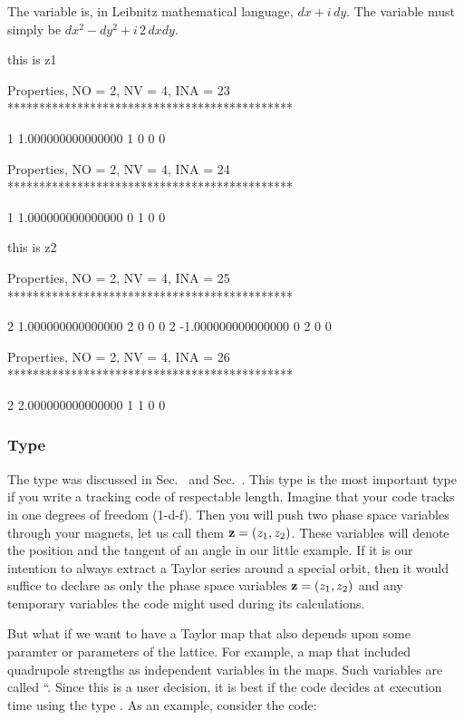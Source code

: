 \documentclass[english,12pt,article]{article} %
\begin{document}
The variable  is, in Leibnitz  mathematical  language, $dx+i \, dy$. The variable  must simply be $dx^2-dy^2+i\, 2\, dx dy$.
\begin{example1}
  this is z1

 Properties, NO =    2, NV =    4, INA =   23
 *********************************************

   1   1.000000000000000       1  0  0  0


 Properties, NO =    2, NV =    4, INA =   24
 *********************************************

   1   1.000000000000000       0  1  0  0

  this is z2

 Properties, NO =    2, NV =    4, INA =   25
 *********************************************

   2   1.000000000000000       2  0  0  0
   2  -1.000000000000000       0  2  0  0


 Properties, NO =    2, NV =    4, INA =   26
 *********************************************

   2   2.000000000000000       1  1  0  0
\end{example1}

\subsubsection{Type \protect{}}  \label{sec:real8code}

The  type was discussed in Sec.~ and Sec.~.
This type is the most important type if you write a tracking code of respectable length.  Imagine that your code tracks in one degrees of freedom (1-d-f). Then you will push two phase space variables through your magnets, let us call them ${\bf z}=(z_1,z_2)$. These variables will denote  the position and the tangent of an angle in our little example.  If it is our  intention to always extract a Taylor series around a special orbit, then  it would suffice to declare as  only the phase space variables ${\bf z}=(z_1,z_2)$ and any temporary variables the code might used during its calculations. 

But what if we want to have a Taylor map that also depends upon some paramter or parameters of the lattice. For example, a map that included quadrupole strengths as independent variables in the maps. Such variables are called ``. Since this is a user decision, it is best if the code decides at execution time using the type .
As an example, consider the code:
\end{document}
